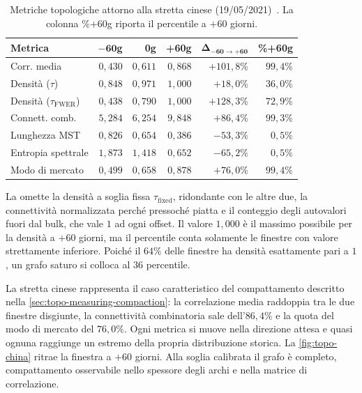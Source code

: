 \begin{table}[H]
\centering
\caption[Metriche attorno alla stretta cinese]{Metriche topologiche attorno alla stretta cinese (19/05/2021)~\cite{griffith2023cryptocurrency}. La colonna \%+60g riporta il percentile a $+60$ giorni.}
\label{tab:topo-event-china}
\small
\begin{tabular*}{\textwidth}{@{\extracolsep{\fill}}lrrrrr@{}}
\toprule
\textbf{Metrica} & \textbf{$\mathbf{-60}$g} & \textbf{0g} & \textbf{+60g} & $\mathbf{\Delta_{-60\to+60}}$ & \textbf{\%+60g} \\
\midrule
Corr. media & $0{,}430$ & $0{,}611$ & $0{,}868$ & $+101{,}8\%$ & $99{,}4\%$ \\
Densità ($\tau$) & $0{,}848$ & $0{,}971$ & $1{,}000$ & $+18{,}0\%$ & $36{,}0\%$ \\
Densità ($\tau_{\mathrm{FWER}}$) & $0{,}438$ & $0{,}790$ & $1{,}000$ & $+128{,}3\%$ & $72{,}9\%$ \\
Connett. comb. & $5{,}284$ & $6{,}254$ & $9{,}848$ & $+86{,}4\%$ & $99{,}3\%$ \\
Lunghezza MST & $0{,}826$ & $0{,}654$ & $0{,}386$ & $-53{,}3\%$ & $0{,}5\%$ \\
Entropia spettrale & $1{,}873$ & $1{,}418$ & $0{,}652$ & $-65{,}2\%$ & $0{,}5\%$ \\
Modo di mercato & $0{,}499$ & $0{,}658$ & $0{,}878$ & $+76{,}0\%$ & $99{,}4\%$ \\
\bottomrule
\end{tabular*}
\end{table}

La  omette la densità a soglia fissa $\tau_{\mathrm{fixed}}$, ridondante con le altre due, la connettività normalizzata perché pressoché piatta e il conteggio degli autovalori fuori dal bulk, che vale $1$ ad ogni offset. Il valore $1{,}000$ è il massimo possibile per la densità a $+60$ giorni, ma il percentile conta solamente le finestre con valore strettamente inferiore. Poiché il $64\%$ delle finestre ha densità esattamente pari a $1$, un grafo saturo si colloca al $36$\textdegree{} percentile.

La stretta cinese rappresenta il caso caratteristico del compattamento descritto nella \cref{sec:topo-measuring-compaction}: la correlazione media raddoppia tra le due finestre disgiunte, la connettività combinatoria sale dell'$86{,}4\%$ e la quota del modo di mercato del $76{,}0\%$. Ogni metrica si muove nella direzione attesa e quasi ognuna raggiunge un estremo della propria distribuzione storica. La \cref{fig:topo-china} ritrae la finestra a $+60$ giorni. Alla soglia calibrata il grafo è completo, compattamento osservabile nello spessore degli archi e nella matrice di correlazione.


